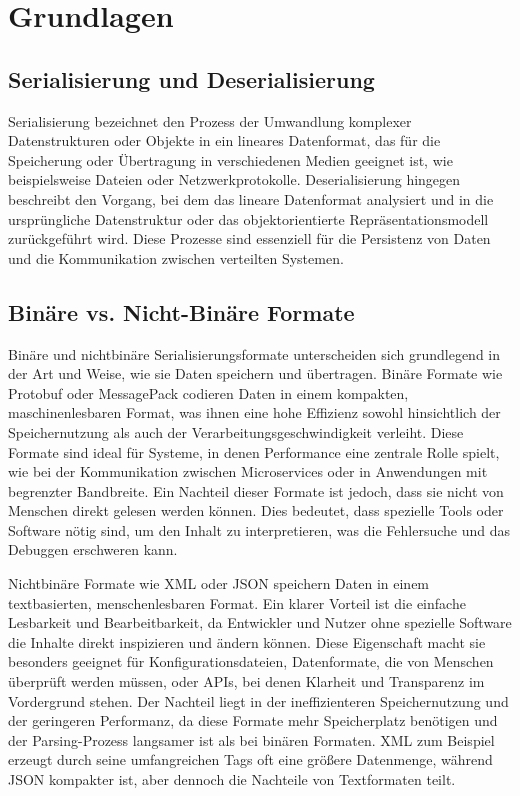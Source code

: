 \documentclass[ngerman]{seminarvorlage}
\begin{document}
\section{Grundlagen}

\subsection{Serialisierung und Deserialisierung}
Serialisierung bezeichnet den Prozess der Umwandlung komplexer Datenstrukturen oder Objekte in ein lineares Datenformat, das für die Speicherung oder Übertragung in verschiedenen Medien geeignet ist, wie beispielsweise Dateien oder Netzwerkprotokolle. Deserialisierung hingegen beschreibt den Vorgang, bei dem das lineare Datenformat analysiert und in die ursprüngliche Datenstruktur oder das objektorientierte Repräsentationsmodell zurückgeführt wird. Diese Prozesse sind essenziell für die Persistenz von Daten und die Kommunikation zwischen verteilten Systemen.

\subsection{Binäre vs. Nicht-Binäre Formate}
Binäre und nichtbinäre Serialisierungsformate unterscheiden sich grundlegend in der Art und Weise, wie sie Daten speichern und übertragen. Binäre Formate wie Protobuf oder MessagePack codieren Daten in einem kompakten, maschinenlesbaren Format, was ihnen eine hohe Effizienz sowohl hinsichtlich der Speichernutzung als auch der Verarbeitungsgeschwindigkeit verleiht. Diese Formate sind ideal für Systeme, in denen Performance eine zentrale Rolle spielt, wie bei der Kommunikation zwischen Microservices oder in Anwendungen mit begrenzter Bandbreite. Ein Nachteil dieser Formate ist jedoch, dass sie nicht von Menschen direkt gelesen werden können. Dies bedeutet, dass spezielle Tools oder Software nötig sind, um den Inhalt zu interpretieren, was die Fehlersuche und das Debuggen erschweren kann.

Nichtbinäre Formate wie XML oder JSON speichern Daten in einem textbasierten, menschenlesbaren Format. Ein klarer Vorteil ist die einfache Lesbarkeit und Bearbeitbarkeit, da Entwickler und Nutzer ohne spezielle Software die Inhalte direkt inspizieren und ändern können. Diese Eigenschaft macht sie besonders geeignet für Konfigurationsdateien, Datenformate, die von Menschen überprüft werden müssen, oder APIs, bei denen Klarheit und Transparenz im Vordergrund stehen. Der Nachteil liegt in der ineffizienteren Speichernutzung und der geringeren Performanz, da diese Formate mehr Speicherplatz benötigen und der Parsing-Prozess langsamer ist als bei binären Formaten. XML zum Beispiel erzeugt durch seine umfangreichen Tags oft eine größere Datenmenge, während JSON kompakter ist, aber dennoch die Nachteile von Textformaten teilt.
\end{document}

